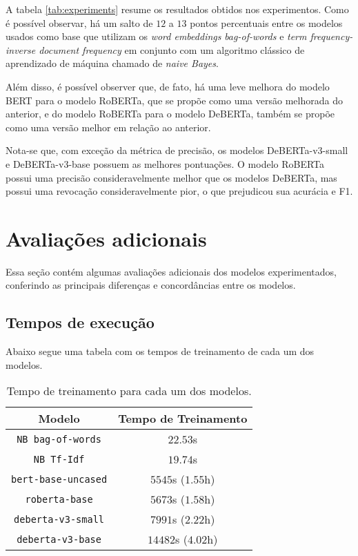 A tabela \ref{tab:experiments} resume os resultados obtidos nos experimentos.
Como é possível observar, há um salto de $12$ a $13$ pontos percentuais entre os
modelos usados como base que utilizam os \textit{word embeddings}
\textit{bag-of-words} e \textit{term frequency-inverse document frequency} em
conjunto com um algoritmo clássico de aprendizado de máquina chamado de
\textit{naive Bayes}.

Além disso, é possível observer que, de fato, há uma leve melhora do modelo BERT
para o modelo RoBERTa, que se propõe como uma versão melhorada do anterior, e do
modelo RoBERTa para o modelo DeBERTa, também se propõe como uma versão melhor em
relação ao anterior.

Nota-se que, com exceção da métrica de precisão, os modelos DeBERTa-v3-small e
DeBERTa-v3-base possuem as melhores pontuações. O modelo RoBERTa possui uma
precisão consideravelmente melhor que os modelos DeBERTa, mas possui uma
revocação consideravelmente pior, o que prejudicou sua acurácia e F1.


\section{Avaliações adicionais}%
\label{sec:avaliacoes_adicionais}

Essa seção contém algumas avaliações adicionais dos modelos experimentados,
conferindo as principais diferenças e concordâncias entre os modelos.

\subsection{Tempos de execução}%
\label{sub:tempos_de_execucao}

Abaixo segue uma tabela com os tempos de treinamento de cada um dos modelos.

\begin{table}[h]
\centering
\caption{Tempo de treinamento para cada um dos modelos.}
\label{tab:experiments_times}
\begin{tabular}{c | c }
   \textbf{Modelo} & \textbf{Tempo de Treinamento} \\ \hline \hline
   \texttt{NB bag-of-words} & $22.53$s \\
   \texttt{NB Tf-Idf} & $19.74$s \\ \hline
   \texttt{bert-base-uncased} & $5545$s ($1.55$h) \\
   \texttt{roberta-base} & $5673$s ($1.58$h) \\
   \texttt{deberta-v3-small} & $7991$s ($2.22$h) \\
   \texttt{deberta-v3-base} & $14482$s ($4.02$h) \\ \hline
\end{tabular}
\end{table}

